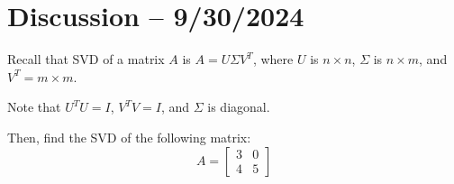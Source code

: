 \documentclass[openany]{book}
\begin{document}
\section{Discussion -- 9/30/2024}
\begin{hw}
	Recall that SVD of a matrix $A$ is $A = U \Sigma V^{T}$, where $U$ is $n \times n$, $\Sigma$ is $n \times m$, and $V^{T} = m \times m$.
	
	Note that $U^{T}U = I$, $V^{T}V = I$, and $\Sigma$ is diagonal.
	
	Then, find the SVD of the following matrix:
	\begin{equation*}
		A = \begin{bmatrix}
			3  & 0 \\ 4 & 5
		\end{bmatrix}
	\end{equation*}
\end{hw}
\end{document}
